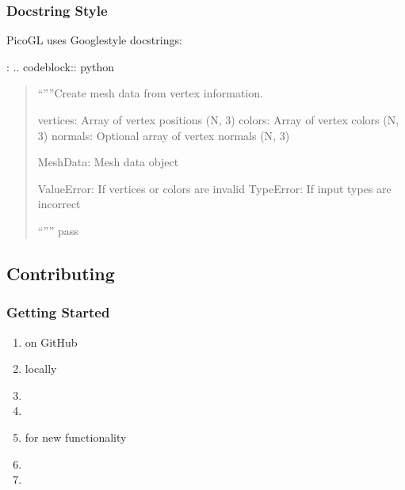 \documentclass[a4paper,10pt,english,openany,oneside]{sphinxmanual}
\begin{document}
\subsubsection{Docstring Style}
\label{\detokenize{development:docstring-style}}
\sphinxAtStartPar
PicoGL uses Google\sphinxhyphen{}style docstrings:

\sphinxAtStartPar
{}:
.. code\sphinxhyphen{}block:: python
\begin{quote}
\begin{description}
\sphinxAtStartPar
“””Create mesh data from vertex information.
\begin{description}
\sphinxAtStartPar
vertices: Array of vertex positions (N, 3)
colors: Array of vertex colors (N, 3)
normals: Optional array of vertex normals (N, 3)

\sphinxAtStartPar
MeshData: Mesh data object

\sphinxAtStartPar
ValueError: If vertices or colors are invalid
TypeError: If input types are incorrect

\end{description}

\sphinxAtStartPar
“””
pass

\end{description}
\end{quote}


\subsection{Contributing}
\label{\detokenize{development:contributing}}

\subsubsection{Getting Started}
\label{\detokenize{development:getting-started}}\begin{enumerate}
%
\item {} 
\sphinxAtStartPar
{} on GitHub

\item {} 
\sphinxAtStartPar
{} locally

\item {} 
\sphinxAtStartPar
{}

\item {} 
\sphinxAtStartPar
{}

\item {} 
\sphinxAtStartPar
{} for new functionality

\item {} 
\sphinxAtStartPar
{}

\item {} 
\sphinxAtStartPar
{}

\end{enumerate}
\end{document}

